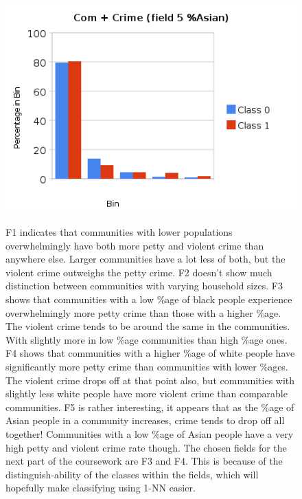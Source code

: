 \documentclass[a4paper,10pt]{article}
\begin{document}
        \begin{figure}[ht!]
          \begin{minipage}[b]{0.5\linewidth}
              \includegraphics[scale=0.45]{charts/ComCrimePics/CC5.png}
          \end{minipage}
          \parbox[b]{3.5in}{
            F1 indicates that communities with lower
            populations overwhelmingly have both more petty and violent crime than anywhere else. Larger communities
            have a lot less of both, but the violent crime outweighs the petty crime. F2 doesn't show much distinction
            between communities with varying household sizes.
            F3 shows that communities with a low \%age of black people experience overwhelmingly more petty crime than
            those with a higher \%age. The violent crime tends to be around the same in the communities. With slightly more
            in low \%age communities than high \%age ones. F4 shows that communities with a higher \%age of white people
            have significantly more petty crime than communities with lower \%ages. The violent crime drops off at that point
            also, but communities with slightly less white people have more violent crime than comparable communities. F5 is
            rather interesting, it appears that as the \%age of Asian people in a community increases, crime tends to  drop
            off all together! Communities with a low \%age of Asian people have a very high petty and violent
            crime rate though. The chosen fields for the next part of the coursework are F3 and F4. This is because of the
            distinguish-ability of the classes within the fields, which will hopefully make classifying using 1-NN easier. 
          }
        \end{figure}
        \newpage
\end{document}
